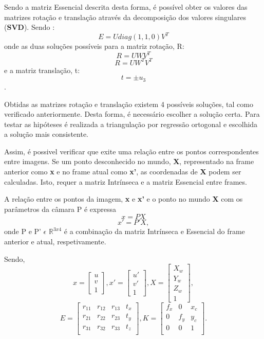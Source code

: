 Sendo a matriz Essencial descrita desta forma, é possível obter os valores das matrizes rotação e translação através da decomposição dos valores singulares (\textbf{SVD}). Sendo : \[ E = U diag(1,1,0) V^{T} \] onde as duas soluções possíveis para a matriz rotação, R: \[ R = UWV^T \] \[ R = UW^TV^T \] e a matriz translação, t: \[ t = \pm u_3 \].


Obtidas as matrizes rotação e translação existem 4 possíveis soluções, tal como verificado anteriormente. Desta forma, é necessário escolher a solução certa. Para testar as hipóteses é realizada a triangulação por regressão ortogonal e escolhida a solução mais consistente.

Assim, é possivel verificar que exite uma relação entre os pontos correspondentes entre imagens. Se um ponto desconhecido no mundo, \textbf{X}, representado na frame anterior como \textbf{x} e no frame atual como \textbf{x'}, as coordenadas de \textbf{X} podem ser calculadas. Isto, requer a matriz Intrínseca e a matriz Essencial entre frames.

A relação entre os pontos da imagem, \textbf{x} e \textbf{x'} e o ponto no mundo \textbf{X} com os parâmetros da câmara P é expressa \[ x = P X \] \[ x' = P'X, \] onde P e P' $\epsilon$  $\mathbb{R}^{3x4}$ é a combinação da matriz Intrínseca e Essencial do frame anterior e atual, respetivamente.

Sendo, \[ x =  \left[ \begin{array}{ccc} u \\ v \\ 1 \end{array} \right],  x' =  \left[ \begin{array}{ccc} u' \\ v' \\ 1 \end{array} \right],  X =  \left[ \begin{array}{cccc} X_w \\ Y_w \\ Z_w \\ 1 \end{array} \right], \] \[ E =  \left[ \begin{array}{cccc} r_{11} & r_{12} & r_{13} & t_{x} \\ r_{21} & r_{22} & r_{23} & t_{y} \\ r_{31} & r_{32} & r_{33} & t_{z} \\ \end{array} \right], K =  \left[ \begin{array}{ccc} f_x & 0 & x_c \\ 0 & f_y & y_c \\ 0 & 0 & 1 \\ \end{array} \right]. \]

